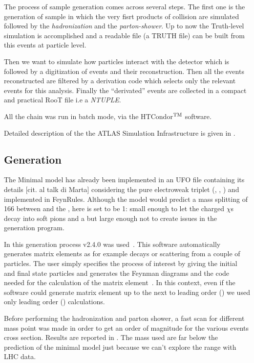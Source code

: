 The process of sample generation comes across several steps. The first one is the generation of sample in which the very fisrt products of \pp collision are simulated followed by the \emph{hadronization} and the \emph{parton-shower}. Up to now the Truth-level simulation is accomplished and a readable file (a TRUTH file) can be built from this events at particle level.

Then we want to simulate how particles interact with the detector which is followed by a digitization of events and their reconstruction. Then all the events reconstructed are filtered by a derivation code which selects only the  relevant events for this analysis. Finally the ``derivated'' events are collected in a compact and practical RooT file i.e a \emph{NTUPLE}.

All the chain was run in batch mode, via  the HTCondor$^{\textup{TM}}$ software.

Detailed description of the the ATLAS Simulation Infrastructure is given in \cite{simulation}.



\subsection{Generation}
The Minimal model has already been implemented in an UFO file containing its details [cit. al talk di Marta] considering the pure electroweak triplet (\chip\!, \chizero\!, \chim\!) and implemented in FeynRules. Although the model would predict a mass splitting of \SI{166}{\mev} between \chipm and the \chizero, here is set to be \SI{1}{\gev}: small enough to let the charged $\chi$s decay into soft pions and a \chizero but large enough not to create issues in the generation program. 

In this generation process \MGMCatNLO v2.4.0 was used~\cite{madgraph}. This software automatically generates matrix elements as for example decays or scattering from a couple of particles. The user simply specifies the process of interest by giving the initial and final state particles and \MADGRAPH generates the Feynman diagrams and the code needed for the calculation of the matrix element~\cite{Pottgen:2016807}. In this context, even if the software could generate matrix element up to the next to leading order (\NLO) we used only leading order (\LO) calculations. 

Before performing the hadronization and parton shower, a fast scan for different mass point was made in order to get an order of magnitude for the various events cross section. Results are reported in \Tab{\ref{tab:xsectheo}}. The mass used are far below the prediction of the minimal model just because we can't explore the \tev range with LHC \RunTwo data.

